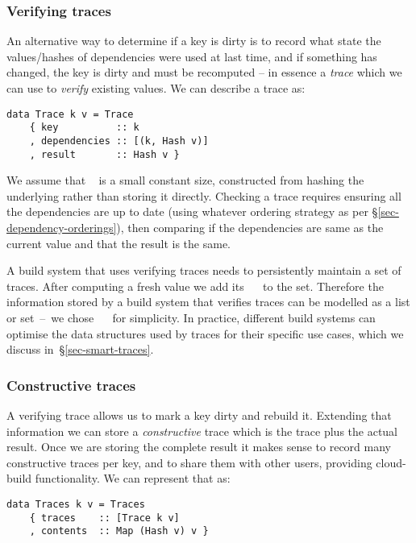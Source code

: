 \subsubsection{Verifying traces}\label{sec-verifying-traces}

An alternative way to determine if a key is dirty is to record what state the
values/hashes of dependencies were used at last time, and if something has
changed, the key is dirty and must be recomputed -- in essence a \emph{trace}
which we can use to \emph{verify} existing values. We can describe a trace as:

\begin{verbatim}
data Trace k v = Trace
    { key          :: k
    , dependencies :: [(k, Hash v)]
    , result       :: Hash v }
\end{verbatim}

We assume that ~ is a small constant size, constructed from hashing the
underlying  rather than storing it directly. Checking a trace requires
ensuring all the dependencies are up to date (using whatever ordering strategy
as per \S\ref{sec-dependency-orderings}), then comparing if the dependencies are
same as the current value and that the result is the same.

A build system that uses verifying traces needs to persistently maintain a set
of traces. After computing a fresh value we add its ~~ to
the set. Therefore the information stored by a build system that verifies
traces can be modelled as a list or set~--~we chose \hs{[Trace}~~\hs{v]}
for simplicity. In practice, different build systems can optimise the data
structures used by traces for their specific use cases, which we discuss
in~\S\ref{sec-smart-traces}.

\subsubsection{Constructive traces}\label{sec-constructive-traces}

A verifying trace allows us to mark a key dirty and rebuild it. Extending that information we can store a \emph{constructive} trace which is the trace plus the actual result. Once we are storing the complete result it makes sense to record many constructive traces per key, and to share them with other users, providing cloud-build functionality. We can represent that as:

\begin{verbatim}
data Traces k v = Traces
    { traces    :: [Trace k v]
    , contents  :: Map (Hash v) v }
\end{verbatim}

